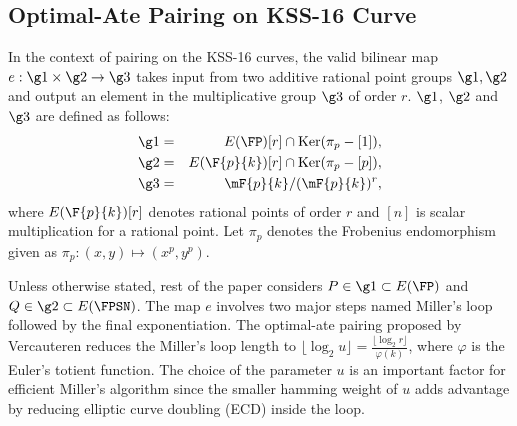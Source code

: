 \subsection{Optimal-Ate Pairing on KSS-16 Curve}
In the context of pairing on the KSS-16 curves, the valid bilinear map $e:\g1 \times \g2 \rightarrow \g3$ takes input from two additive rational point groups $\g1, \g2$ 
and output an element in the multiplicative group $\g3$ of order $r$. 
$\g1$, $\g2$ and $\g3$ are defined as follows:
\begin{eqnarray}\label{eq:g1}
\g1 & = &  E(\FP) [r] \cap \text{Ker}(\pi_p - [1]), \nonumber \\
\g2 & = &  E(\F{p}{k}) [r] \cap \text{Ker}(\pi_p - [p]), \nonumber \\
\g3 & = & \mF{p}{k}/(\mF{p}{k})^r, \nonumber
\end{eqnarray}
where $E(\F{p}{k})[r]$ denotes rational points of order $r$ and $[n]$ is scalar multiplication for a rational point. 
Let $\pi_p$ denotes the Frobenius endomorphism given as $\pi_p: (x,y) \mapsto (x^p,y^p)$.

Unless otherwise stated, rest of the paper considers $P \in \g1 \subset E(\FP)$ and  $Q \in \g2 \subset  E(\FPSN)$. The map $e$ involves two major steps named Miller's loop followed by the final exponentiation.
The optimal-ate pairing \cite{op_ate_p} proposed by Vercauteren reduces the Miller's loop length  to $\lfloor \log_2 u \rfloor = \frac{\lfloor \log_2 r \rfloor }{\varphi(k)} $, where $\varphi$ is the Euler's totient function.
The choice of the parameter $u$ is an important factor for efficient Miller's algorithm since the smaller hamming weight of $u$ adds advantage by reducing elliptic curve doubling (ECD) inside the loop.

